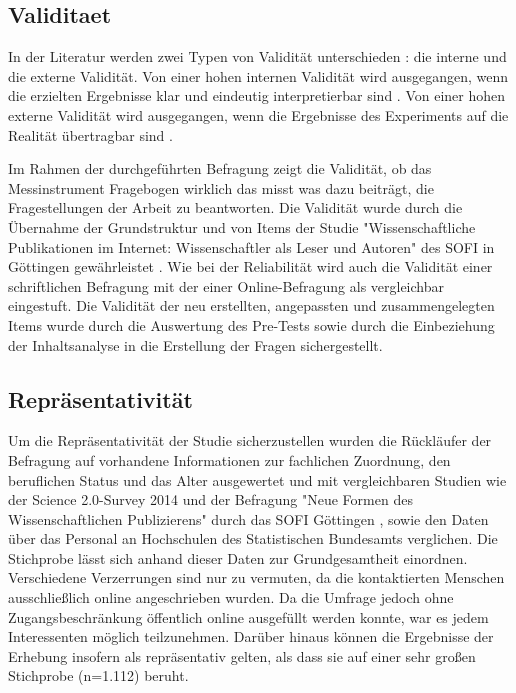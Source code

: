 \subsection{Validitaet}
In der Literatur werden zwei Typen von Validität unterschieden \cite{rost_2004_lehrbuch}: die interne und die externe Validität. Von einer hohen internen Validität wird ausgegangen, wenn die erzielten Ergebnisse klar und eindeutig interpretierbar sind \cite{raab_2012_fragebogen}. Von einer hohen externe Validität wird ausgegangen, wenn die Ergebnisse des Experiments auf die Realität übertragbar sind \cite{bortz1995forschungsmethoden}.

Im Rahmen der durchgeführten Befragung zeigt die Validität, ob das Messinstrument Fragebogen wirklich das misst was dazu beiträgt, die Fragestellungen der Arbeit zu beantworten. Die Validität wurde durch die Übernahme der Grundstruktur und von Items der Studie "Wissenschaftliche Publikationen im Internet: Wissenschaftler als Leser und Autoren" des SOFI in Göttingen gewährleistet \cite{hanekop_2008}. Wie bei der Reliabilität wird auch die Validität einer schriftlichen Befragung mit der einer Online-Befragung als vergleichbar eingestuft. Die Validität der neu erstellten, angepassten  und zusammengelegten Items wurde durch die Auswertung des Pre-Tests sowie durch die Einbeziehung der Inhaltsanalyse in die Erstellung der Fragen sichergestellt.

\subsection{Repräsentativität}

Um die Repräsentativität der Studie sicherzustellen wurden die Rückläufer der Befragung auf vorhandene Informationen zur fachlichen Zuordnung, den beruflichen Status und das Alter ausgewertet und mit vergleichbaren Studien wie der Science 2.0-Survey 2014 \cite{pscheida_2015_science20} und der Befragung "Neue Formen des Wissenschaftlichen Publizierens" durch das SOFI Göttingen \cite{hanekop_2008}, sowie den Daten über das Personal an Hochschulen des Statistischen Bundesamts \cite{destatis_2014} verglichen. Die Stichprobe lässt sich anhand dieser Daten zur Grundgesamtheit einordnen. Verschiedene Verzerrungen sind nur zu vermuten, da die kontaktierten Menschen ausschließlich online angeschrieben wurden. Da die Umfrage jedoch ohne Zugangsbeschränkung öffentlich online ausgefüllt werden konnte, war es jedem Interessenten möglich teilzunehmen. Darüber hinaus können die Ergebnisse der Erhebung insofern als repräsentativ gelten, als dass sie auf  einer sehr großen Stichprobe (n=1.112) beruht.

